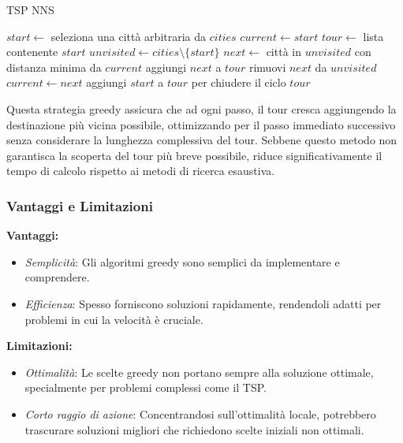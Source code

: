 \begin{algorithm}
	\caption{TSP \gls{NNS}}\label{alg:greedybestfirst}
	\begin{algorithmic}[1]
		\State $start \gets$ seleziona una città arbitraria da $cities$
		\State $current \gets start$
		\State $tour \gets$ lista contenente $start$
		\State $unvisited \gets cities \setminus \{start\}$
		\State $next \gets$ città in $unvisited$ con distanza minima da $current$
		\State aggiungi $next$ a $tour$
		\State rimuovi $next$ da $unvisited$
		\State $current \gets next$
		\EndWhile
		\State aggiungi $start$ a $tour$ per chiudere il ciclo
		\State \Return $tour$
		\EndProcedure
	\end{algorithmic}
\end{algorithm}

Questa strategia greedy assicura che ad ogni passo, il tour cresca aggiungendo la destinazione più vicina possibile, ottimizzando per il passo immediato successivo senza considerare la lunghezza complessiva del tour. Sebbene questo metodo non garantisca la scoperta del tour più breve possibile, riduce significativamente il tempo di calcolo rispetto ai metodi di ricerca esaustiva.


\subsubsection{Vantaggi e Limitazioni}

\textbf{Vantaggi:}
\begin{itemize}
	\item \textit{Semplicità}: Gli algoritmi greedy sono semplici da implementare e comprendere.
	\item \textit{Efficienza}: Spesso forniscono soluzioni rapidamente, rendendoli adatti per problemi in cui la velocità è cruciale.
\end{itemize}

\textbf{Limitazioni:}
\begin{itemize}
	\item \textit{Ottimalità}: Le scelte greedy non portano sempre alla soluzione ottimale, specialmente per problemi complessi come il \gls{TSP}.
	\item \textit{Corto raggio di azione}: Concentrandosi sull'ottimalità locale, potrebbero trascurare soluzioni migliori che richiedono scelte iniziali non ottimali.
\end{itemize}

